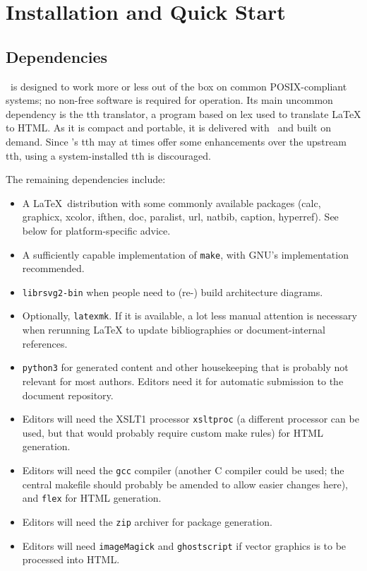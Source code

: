 \documentclass[11pt,a4paper]{ivoa}
\begin{document}
\section{Installation and Quick Start}
\label{sect:quick}

\subsection{Dependencies}

\ivoatex\ is designed to work more or less out of the box on common
POSIX-compliant systems; no non-free software is required for operation.
Its main uncommon dependency is the tth translator,
a program based on lex used to translate LaTeX
to HTML.  As it is compact and portable, it is delivered with
\ivoatex~and built on demand.
Since \ivoatex's tth may at times offer
some enhancements over the upstream tth, using a system-installed tth is
discouraged.

The remaining dependencies include:

\begin{itemize}
\item A \LaTeX\ distribution with some commonly available packages (calc,
graphicx, xcolor, ifthen, doc, paralist, url, natbib, caption,
hyperref).  See below for platform-specific advice.
\item A sufficiently capable implementation of \texttt{make}, with GNU's
implementation recommended.
\item \texttt{librsvg2-bin} when people need to (re-) build architecture
diagrams.
\item Optionally, \texttt{latexmk}.  If it is available, a lot less
manual attention is necessary when rerunning LaTeX to update
bibliographies or document-internal references.
\item \texttt{python3} for  generated content and other housekeeping
that is probably not relevant for most authors.  Editors need it for
automatic submission to the document repository.
\item Editors will need the XSLT1 processor
\texttt{xsltproc} (a different processor can
be used, but that would probably require custom make rules) for HTML
generation.
\item Editors will need the
\texttt{gcc} compiler (another C compiler could be used; the
central makefile should probably be amended to allow easier changes
here), and \texttt{flex} for HTML generation.
\item Editors will need the \texttt{zip} archiver for package generation.
\item Editors will need \texttt{imageMagick} and \texttt{ghostscript} if
vector graphics is to be processed into HTML.
\end{itemize}
\end{document}
